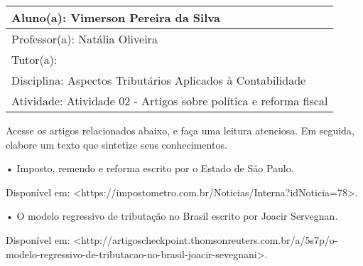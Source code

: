\documentclass[12pt,a4paper]{article}
\begin{document}
\begin{table}[h!]
	\begin{tabular}{|p{440pt}|}
		\hline
		\textsf{Aluno(a): Vimerson Pereira da Silva}\\
		\hline
		\textsf{Professor(a): Natália Oliveira}\\
		\hline
		\textsf{Tutor(a):}\\
		\hline
		\textsf{Disciplina: Aspectos Tributários Aplicados à Contabilidade}\\
		\hline
		\textsf{Atividade: Atividade 02 - Artigos sobre política e reforma fiscal}\\
		\hline
	\end{tabular}
\end{table}

\onehalfspacing

\noindent
Acesse os artigos relacionados abaixo, e faça uma leitura atenciosa. Em seguida, elabore um texto que sintetize seus conhecimentos.

• Imposto, remendo e reforma escrito por o Estado de São Paulo.

Disponível em: <https://impostometro.com.br/Noticias/Interna?idNoticia=78>.

• O modelo regressivo de tributação no Brasil escrito por Joacir Servegnan.

Disponível em: <http://artigoscheckpoint.thomsonreuters.com.br/a/5s7p/o-modelo-regressivo-de-tributacao-no-brasil-joacir-sevegnani>.\\
\newline
\end{document}
